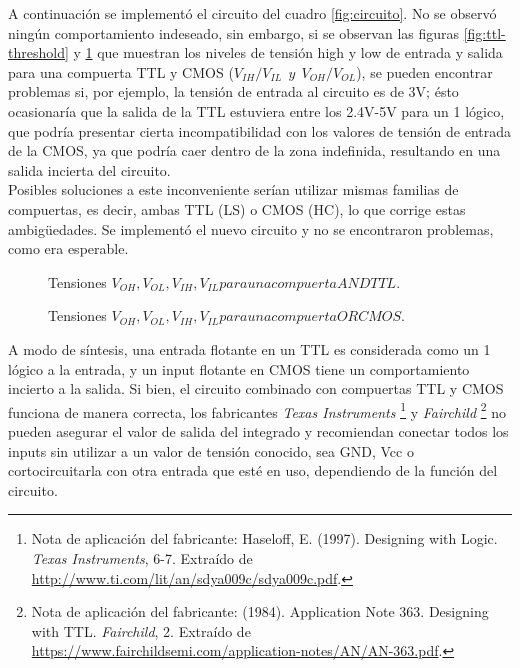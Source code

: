 A continuación se implementó el circuito del cuadro \ref{fig:circuito}. No se observó ningún comportamiento indeseado, 
sin embargo, si se observan las figuras \ref{fig:ttl-threshold} y \ref{fig:cmos-threshold} que muestran los niveles de tensión high y low de entrada y salida 
para una compuerta TTL y CMOS ($V_{IH}/V_{IL}~~y~~V_{OH}/V_{OL}$), se pueden encontrar problemas si, por ejemplo, 
la tensión de entrada al circuito es de 3V; ésto ocasionaría que la salida de la TTL estuviera entre los 2.4V-5V para un 1 lógico, 
que podría presentar cierta incompatibilidad con los valores de tensión de entrada de la CMOS, ya que podría caer dentro de la zona indefinida, 
resultando en una salida incierta del circuito.\\
Posibles soluciones a este inconveniente serían utilizar mismas familias de compuertas, es decir, ambas TTL (LS) o CMOS (HC), lo que corrige estas ambigüedades.
Se implementó el nuevo circuito y no se encontraron problemas, como era esperable.

\begin{figure}[H]
    \begin{minipage}{.49\linewidth}
        \centering
        \caption{Tensiones $V_{OH}, V_{OL}, V_{IH}, V_{IL} para una compuerta AND TTL.$}
        \label{fig:ttl-threshold}
    \end{minipage}
    \begin{minipage}{.5\linewidth}
        \centering
        \caption{Tensiones $V_{OH}, V_{OL}, V_{IH}, V_{IL} para una compuerta OR CMOS.$}
        \label{fig:cmos-threshold}
    \end{minipage}
\end{figure}


A modo de síntesis, una entrada flotante en un TTL es considerada como un 1 lógico a la entrada, y un input flotante en CMOS tiene un comportamiento incierto
a la salida. Si bien, el circuito combinado con compuertas TTL y CMOS funciona de manera correcta, los fabricantes \textit{Texas Instruments}
\footnote{Nota de aplicación del fabricante:
Haseloff, E. (1997). Designing with Logic. \textit{Texas Instruments}, 6-7. Extraído de \url{http://www.ti.com/lit/an/sdya009c/sdya009c.pdf}.} 
y \textit{Fairchild} 
\footnote{Nota de aplicación del fabricante:
(1984). Application Note 363. Designing with TTL. \textit{Fairchild}, 2. Extraído de \url{https://www.fairchildsemi.com/application-notes/AN/AN-363.pdf}.} 
no pueden asegurar el valor de salida del integrado y recomiendan conectar todos los inputs sin utilizar a un valor de tensión conocido, sea GND, Vcc o cortocircuitarla con otra entrada que esté en uso, dependiendo de la función del circuito.
